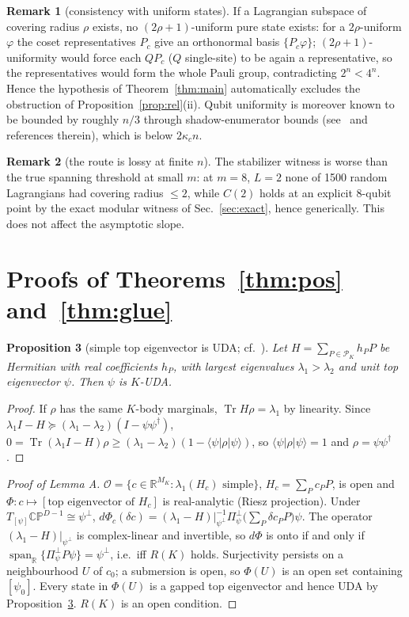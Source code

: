 \documentclass[aps,pra,onecolumn,superscriptaddress,nofootinbib,longbibliography,10pt]{revtex4-2}
\newtheorem{proposition}{Proposition}[section]
\theoremstyle{definition}
\newtheorem{remark}[proposition]{Remark}
\newcommand{\RR}{\mathbb R}
\newcommand{\CP}{\mathbb{CP}}
\newcommand{\Tr}{\operatorname{Tr}}
\newcommand{\spanR}{\operatorname{span}_{\RR}}
\newcommand{\Pperp}{\Pi^{\perp}_{\psi}}
\newcommand{\kc}{\kappa_c}
\begin{document}
\begin{remark}[consistency with uniform states]
If a Lagrangian subspace of covering radius $\rho$ exists, no $(2\rho+1)$-uniform pure state exists: for a $2\rho$-uniform $\varphi$ the coset representatives $P_c$ give an orthonormal basis $\{P_c\varphi\}$; $(2\rho+1)$-uniformity would force each $QP_c$ ($Q$ single-site) to be again a representative, so the representatives would form the whole Pauli group, contradicting $2^n<4^n$. Hence the hypothesis of Theorem~\ref{thm:main} automatically excludes the obstruction of Proposition~\ref{prop:rel}(ii). Qubit uniformity is moreover known to be bounded by roughly $n/3$ through shadow-enumerator bounds (see~\cite{Scott04} and references therein), which is below $2\kc n$.
\end{remark}
\begin{remark}[the route is lossy at finite $n$]
The stabilizer witness is worse than the true spanning threshold at small $m$: at $m=8$, $L=2$ none of 1500 random Lagrangians had covering radius $\le2$, while $C(2)$ holds at an explicit 8-qubit point by the exact modular witness of Sec.~\ref{sec:exact}, hence generically. This does not affect the asymptotic slope.
\end{remark}

\section{Proofs of Theorems~\ref{thm:pos} and~\ref{thm:glue}}\label{sec:proof2}

\begin{proposition}[simple top eigenvector is UDA; cf.~\cite{CJWZ12,KJTV19}]\label{prop:top}
Let $H=\sum_{P\in\mathcal P_K}h_PP$ be Hermitian with real coefficients $h_P$, with largest eigenvalues $\lambda_1>\lambda_2$ and unit top eigenvector $\psi$. Then $\psi$ is $K$-UDA.
\end{proposition}
\begin{proof}
If $\rho$ has the same $K$-body marginals, $\Tr H\rho=\lambda_1$ by linearity. Since $\lambda_1I-H\succeq(\lambda_1-\lambda_2)(I-\psi\psi^\dagger)$, $0=\Tr(\lambda_1I-H)\rho\ge(\lambda_1-\lambda_2)(1-\langle\psi|\rho|\psi\rangle)$, so $\langle\psi|\rho|\psi\rangle=1$ and $\rho=\psi\psi^\dagger$.
\end{proof}

\begin{proof}[Proof of Lemma A]
$\mathcal O=\{c\in\RR^{M_K}:\lambda_1(H_c)\text{ simple}\}$, $H_c=\sum_Pc_PP$, is open and $\Phi:c\mapsto[\text{top eigenvector of }H_c]$ is real-analytic (Riesz projection). Under $T_{[\psi]}\CP^{D-1}\cong\psi^\perp$,
$d\Phi_c(\delta c)=(\lambda_1-H)|_{\psi^\perp}^{-1}\Pperp\big(\sum_P\delta c_PP\big)\psi$.
The operator $(\lambda_1-H)|_{\psi^\perp}$ is complex-linear and invertible, so $d\Phi$ is onto if and only if $\spanR\{\Pperp P\psi\}=\psi^\perp$, i.e.\ iff $R(K)$ holds. Surjectivity persists on a neighbourhood $U$ of $c_0$; a submersion is open, so $\Phi(U)$ is an open set containing $[\psi_0]$. Every state in $\Phi(U)$ is a gapped top eigenvector and hence UDA by Proposition~\ref{prop:top}. $R(K)$ is an open condition.
\end{proof}
\end{document}
